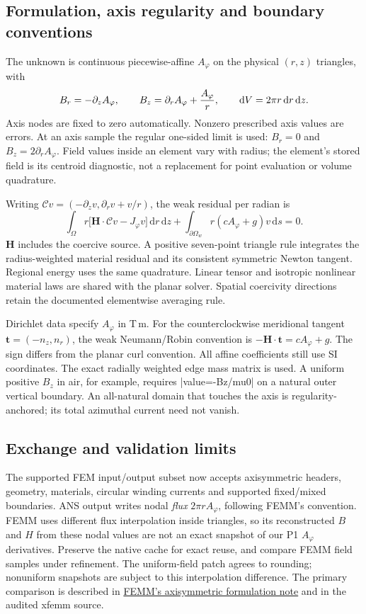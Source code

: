 \subsection{Formulation, axis regularity and boundary conventions}
The unknown is continuous piecewise-affine $A_\varphi$ on the physical
$(r,z)$ triangles, with
\[
 B_r=-\partial_z A_\varphi,\qquad
 B_z=\partial_r A_\varphi+{A_\varphi\over r},\qquad
 \mathrm dV=2\pi r\,\mathrm dr\,\mathrm dz.
\]
Axis nodes are fixed to zero automatically. Nonzero prescribed axis values
are errors. At an axis sample the regular one-sided limit is used:
$B_r=0$ and $B_z=2\partial_r A_\varphi$. Field values inside an element vary
with radius; the element's stored field is its centroid diagnostic, not a
replacement for point evaluation or volume quadrature.

Writing $\mathcal C v=(-\partial_zv,\partial_rv+v/r)$, the weak residual per
radian is
\[
 \int_\Omega r\bigl[\mathbf H\cdot\mathcal Cv-J_\varphi v\bigr]
       \,\mathrm dr\,\mathrm dz
 +\int_{\partial\Omega_w}r(cA_\varphi+g)v\,\mathrm ds=0.
\]
$\mathbf H$ includes the coercive source. A positive seven-point triangle rule
integrates the radius-weighted material residual and its consistent symmetric
Newton tangent. Regional energy uses the same quadrature. Linear tensor and
isotropic nonlinear material laws are shared with the planar solver. Spatial
coercivity directions retain the documented elementwise averaging rule.

Dirichlet data specify $A_\varphi$ in T\,m. For the counterclockwise meridional
tangent $\mathbf t=(-n_z,n_r)$, the weak Neumann/Robin convention is
\emph{$-\mathbf H\cdot\mathbf t=cA_\varphi+g$}. The sign differs from the planar
curl convention. All affine coefficients still use SI coordinates. The exact
radially weighted edge mass matrix is used. A uniform positive $B_z$ in air,
for example, requires |value=-Bz/mu0| on a natural outer vertical boundary.
An all-natural domain that touches the axis is regularity-anchored; its total
azimuthal current need not vanish.

\subsection{Exchange and validation limits}
The supported FEM input/output subset now accepts axisymmetric headers, geometry,
materials, circular winding currents and supported fixed/mixed boundaries.
ANS output writes nodal \emph{flux} $2\pi rA_\varphi$, following FEMM's convention.
FEMM uses different flux interpolation inside triangles, so its reconstructed
$B$ and $H$ from these nodal values are not an exact snapshot of our P1
$A_\varphi$ derivatives. Preserve the native cache for exact reuse, and compare
FEMM field samples under refinement. The uniform-field patch agrees to rounding;
nonuniform snapshots are subject to this interpolation difference.
The primary comparison is described in
\href{https://femm.info/doku/doku.php?id=axisymmetricformulation}{FEMM's
axisymmetric formulation note} and in the audited xfemm source.

